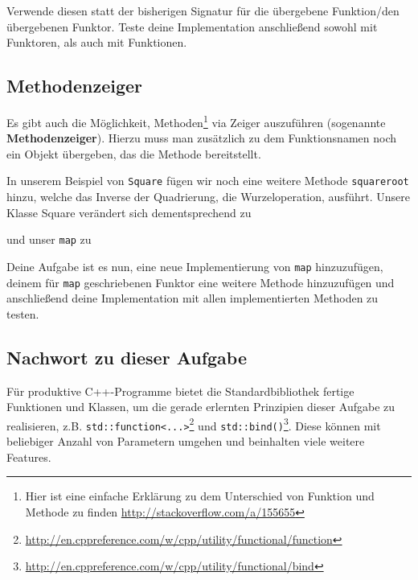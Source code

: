 Verwende diesen statt der bisherigen Signatur für die übergebene Funktion/den übergebenen Funktor.
Teste deine Implementation anschließend sowohl mit Funktoren, als auch mit Funktionen.

\subsection{Methodenzeiger}
\label{sec:functional_method}
Es gibt auch die Möglichkeit, Methoden\footnote{Hier ist eine einfache Erklärung zu dem Unterschied von Funktion und Methode zu finden \url{http://stackoverflow.com/a/155655}} via Zeiger auszuführen (sogenannte \textbf{Methodenzeiger}).
Hierzu muss man zusätzlich zu dem Funktionsnamen noch ein Objekt übergeben, das die Methode bereitstellt.

In unserem Beispiel von \lstinline{Square} fügen wir noch eine weitere Methode \lstinline{squareroot} hinzu, welche das Inverse der Quadrierung, die Wurzeloperation, ausführt.
Unsere Klasse Square verändert sich dementsprechend zu



und unser \lstinline{map} zu 



Deine Aufgabe ist es nun, eine neue Implementierung von \lstinline{map} hinzuzufügen, deinem für \lstinline{map} geschriebenen Funktor eine weitere Methode hinzuzufügen und anschließend deine Implementation mit allen implementierten Methoden zu testen.

\subsection*{Nachwort zu dieser Aufgabe}
Für produktive C++-Programme bietet die Standardbibliothek fertige Funktionen und Klassen, um die gerade erlernten Prinzipien dieser Aufgabe zu realisieren, z.B. \lstinline{std::function<...>}\footnote{\url{http://en.cppreference.com/w/cpp/utility/functional/function}} und \lstinline{std::bind()}\footnote{\url{http://en.cppreference.com/w/cpp/utility/functional/bind}}.
Diese können mit beliebiger Anzahl von Parametern umgehen und beinhalten viele weitere Features.
